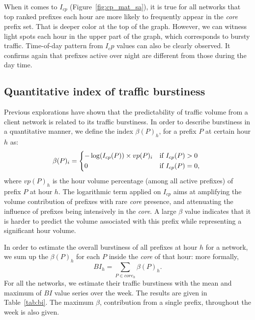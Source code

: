 When it comes to $I_{cp}$ (Figure~\ref{fig:cp_mat_sa}), it is true for all networks that top ranked prefixes each hour are more likely to frequently appear in the \textit{core} prefix set.
That is deeper color at the top of the graph.
However, we can witness light spots each hour in the upper part of the graph, which corresponds to bursty traffic.
Time-of-day pattern from $I_cp$ values can also be clearly observed. 
It confirms again that prefixes active over night are different from those during the day time.


\subsection{Quantitative index of traffic burstiness}
Previous explorations have shown that the predictability of traffic volume from a client network is related to its traffic burstiness.
In order to describe burstiness in a quantitative manner, we define the index $\beta(P)_h$, for a prefix $P$ at certain hour $h$ as:
\begin{equation*}
\beta(P)_i = \begin{dcases*}
         -\log(I_{cp}(P)) \times vp(P)_i & if $I_{cp}(P) > 0$\\
        0 & if $I_{cp}(P) = 0$,
        \end{dcases*}
\label{eq:beta}
\end{equation*}
where $vp(P)_h$ is the hour volume percentage (among all active prefixes) of prefix $P$ at hour $h$.
The logarithmic term applied on $I_{cp}$ aims at amplifying the volume contribution of prefixes with rare \textit{core} presence, and attenuating the influence of prefixes being intensively in the \textit{core}.
A large $\beta$ value indicates that it is harder to predict the volume associated with this prefix while representing a significant hour volume.

In order to estimate the overall burstiness of all prefixes at hour $h$ for a network, we sum up the $\beta(P)_h$ for each $P$ inside the \textit{core} of that hour: more formally, 
\begin{equation*}
BI_h = \sum_{P \in \textit{core}_h} \beta(P)_h.
\label{eq:bi}
\end{equation*}
For all the networks, we estimate their traffic burstiness with the mean and maximum of $BI$ value series over the week. The results are given in Table~\ref{tab:bi}. The maximum $\beta$, contribution from a single prefix, throughout the week is also given.

